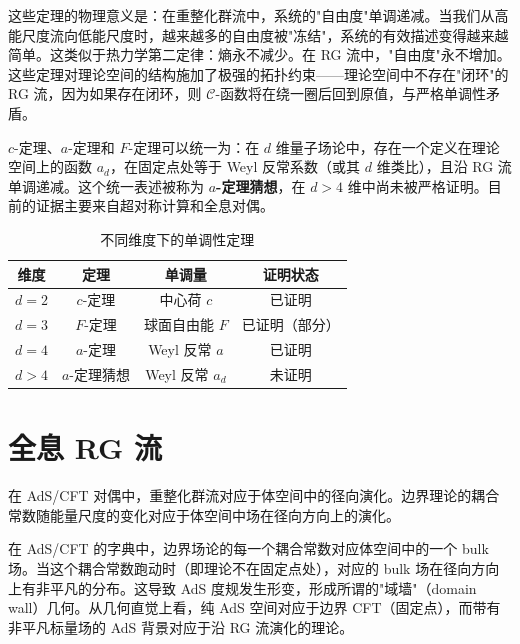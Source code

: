 \begin{note}[物理意义]
这些定理的物理意义是：在重整化群流中，系统的"自由度"单调递减。当我们从高能尺度流向低能尺度时，越来越多的自由度被"冻结"，系统的有效描述变得越来越简单。这类似于热力学第二定律：熵永不减少。在 RG 流中，"自由度"永不增加。这些定理对理论空间的结构施加了极强的拓扑约束——理论空间中不存在"闭环"的 RG 流，因为如果存在闭环，则 $\mathcal{C}$-函数将在绕一圈后回到原值，与严格单调性矛盾。
\end{note}

\begin{remark}
$c$-定理、$a$-定理和 $F$-定理可以统一为：在 $d$ 维量子场论中，存在一个定义在理论空间上的函数 $a_d$，在固定点处等于 Weyl 反常系数（或其 $d$ 维类比），且沿 RG 流单调递减。这个统一表述被称为 \textbf{$a$-定理猜想}，在 $d > 4$ 维中尚未被严格证明。目前的证据主要来自超对称计算和全息对偶。
\end{remark}

\begin{table}[htbp]
\centering
\caption{不同维度下的单调性定理}
\label{tab:monotonicity_theorems}
\begin{tabular}{cccc}
\toprule
维度 & 定理 & 单调量 & 证明状态 \\
\midrule
$d = 2$ & $c$-定理 \cite{Zamolodchikov1986} & 中心荷 $c$ & 已证明 \\
$d = 3$ & $F$-定理 & 球面自由能 $F$ & 已证明（部分） \\
$d = 4$ & $a$-定理 \cite{Komargodski2011} & Weyl 反常 $a$ & 已证明 \\
$d > 4$ & $a$-定理猜想 & Weyl 反常 $a_d$ & 未证明 \\
\bottomrule
\end{tabular}
\end{table}

\section{全息 RG 流}

在 AdS/CFT 对偶中，重整化群流对应于体空间中的径向演化。边界理论的耦合常数随能量尺度的变化对应于体空间中场在径向方向上的演化。

\begin{note}[物理动机]
在 AdS/CFT 的字典中，边界场论的每一个耦合常数对应体空间中的一个 bulk 场。当这个耦合常数跑动时（即理论不在固定点处），对应的 bulk 场在径向方向上有非平凡的分布。这导致 AdS 度规发生形变，形成所谓的"域墙"（domain wall）几何。从几何直觉上看，纯 AdS 空间对应于边界 CFT（固定点），而带有非平凡标量场的 AdS 背景对应于沿 RG 流演化的理论。
\end{note}

